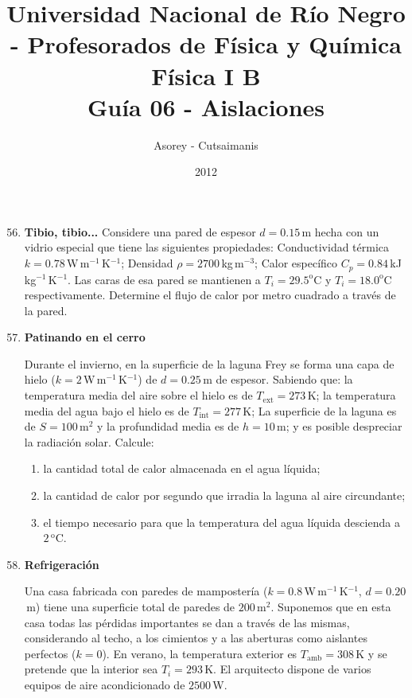 \documentclass[a4paper,12pt]{article}
\begin{document}
\title{
{\normalsize{Universidad Nacional de Río Negro - Profesorados de Física y
Química}}\\ Física I B \\ Guía 06 - Aislaciones
}
\author{Asorey - Cutsaimanis}
\date{2012}
\maketitle

\begin{enumerate}
\setcounter{enumi}{55}     %


\item{\bf{Tibio, tibio...}}
Considere una pared de espesor $d=0.15$\,m hecha con un vidrio especial que tiene las siguientes propiedades:
Conductividad térmica $k=0.78$\,W\,m$^{-1}$\,K$^{-1}$;
Densidad $\rho = 2700$\,kg\,m$^{-3}$;
Calor específico $C_p = 0.84$\,kJ\,kg$^{-1}$\,K$^{-1}$.
Las caras de esa pared se mantienen a $T_i=29.5^\mathrm{o}$C y $T_i=18.0^\mathrm{o}$C respectivamente. Determine el flujo de calor por metro cuadrado a través de la pared.

\item{\bf{Patinando en el cerro}}

Durante el invierno, en la superficie de la laguna Frey se forma una capa de
hielo ($k=2$\,W\,m$^{-1}$\,K$^{-1}$) de $d=0.25$\,m de espesor. Sabiendo que:
la temperatura media del aire sobre el hielo es de $T_\mathrm{ext}=273$\,K; la
temperatura media del agua bajo el hielo es de $T_\mathrm{int}=277$\,K; La superficie
de la laguna es de $S=100$\,m$^2$ y la profundidad media es de $h=10$\,m; y
es posible despreciar la radiación solar. Calcule:

\begin{enumerate}
\item la cantidad total de calor almacenada en el agua líquida;
\item la cantidad de calor por segundo que irradia la laguna al aire circundante;
\item el tiempo necesario para que la temperatura del agua líquida descienda a $2$\,$^\mathrm{o}$C.
\end{enumerate}


\item{\bf{Refrigeración}}

Una casa fabricada con paredes de mampostería ($k=0.8$\,W\,m$^{-1}$\,K$^{-1}$,
$d=0.20$\,m) tiene una superficie total de paredes de $200$\,m$^2$. Suponemos
que en esta casa todas las pérdidas importantes se dan a través de las mismas,
considerando al techo, a los cimientos y a las aberturas como aislantes
perfectos ($k=0$).  En verano, la temperatura exterior es $T_{\mathrm{amb}}=308$\,K y se
pretende que la interior sea $T_{i}=293$\,K. El arquitecto dispone de varios
equipos de aire acondicionado de $2500$\,W.


\end{enumerate}
\end{document}

